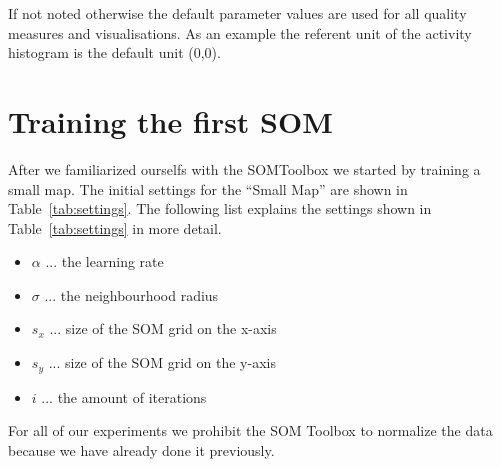 \documentclass{acm_proc_article-sp}
\begin{document}
If not noted otherwise the default parameter values are used for all quality measures and visualisations.
As an example the referent unit of the activity histogram is the default unit (0,0).

\section{Training the first SOM}

After we familiarized ourselfs with the SOMToolbox we started by training a small
map. The initial settings for the ``Small Map'' are shown in Table~\ref{tab:settings}. 
The following list explains the settings shown in Table~\ref{tab:settings} in more detail.

\begin{itemize}
    \item $\alpha$ ... the learning rate
    \item $\sigma$ ... the neighbourhood radius
    \item $s_x$ ... size of the SOM grid on the x-axis
    \item $s_y$ ... size of the SOM grid on the y-axis
    \item $i$ ... the amount of iterations
\end{itemize}

For all of our experiments we prohibit the SOM Toolbox to normalize the data because we have
already done it previously.
\end{document}
